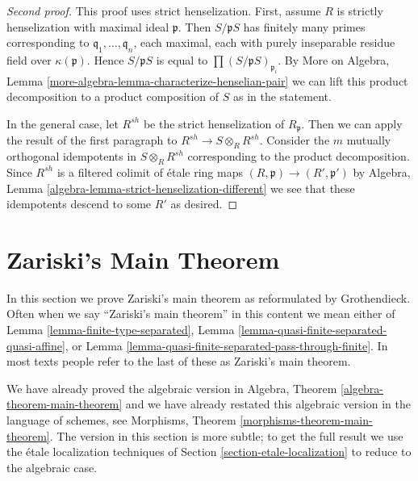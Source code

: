 \begin{proof}[Second proof]
This proof uses strict henselization. First, assume $R$ is strictly
henselization with maximal ideal $\mathfrak p$. Then $S/\mathfrak p S$
has finitely many primes corresponding to
$\mathfrak q_1, \ldots, \mathfrak q_n$, each maximal,
each with purely inseparable residue field over $\kappa(\mathfrak p)$.
Hence $S/\mathfrak p S$ is equal to $\prod (S/\mathfrak p S)_{\mathfrak p_i}$.
By More on Algebra, Lemma \ref{more-algebra-lemma-characterize-henselian-pair}
we can lift this product decomposition to a product composition of $S$
as in the statement.

\medskip\noindent
In the general case, let $R^{sh}$ be the strict henselization of
$R_\mathfrak p$. Then we can apply the result of the first paragraph
to $R^{sh} \to S \otimes_R R^{sh}$. Consider the $m$ mutually orthogonal
idempotents in $S \otimes_R R^{sh}$ corresponding to the product
decomposition. Since $R^{sh}$ is a filtered colimit of \'etale
ring maps $(R, \mathfrak p) \to (R', \mathfrak p')$ by
Algebra, Lemma \ref{algebra-lemma-strict-henselization-different}
we see that these idempotents descend to some $R'$ as desired.
\end{proof}







\section{Zariski's Main Theorem}
\label{section-application-etale-neighbourhoods}

\noindent
In this section we prove Zariski's main theorem as reformulated by Grothendieck.
Often when we say ``Zariski's main theorem'' in this content we mean either of
Lemma \ref{lemma-finite-type-separated},
Lemma \ref{lemma-quasi-finite-separated-quasi-affine}, or
Lemma \ref{lemma-quasi-finite-separated-pass-through-finite}.
In most texts people refer to the last of these as
Zariski's main theorem.

\medskip\noindent
We have already proved the algebraic version in
Algebra, Theorem \ref{algebra-theorem-main-theorem}
and we have already restated this algebraic version
in the language of schemes, see
Morphisms, Theorem \ref{morphisms-theorem-main-theorem}.
The version in this section is more subtle; to get the full
result we use the \'etale localization techniques
of Section \ref{section-etale-localization} to reduce to
the algebraic case.

